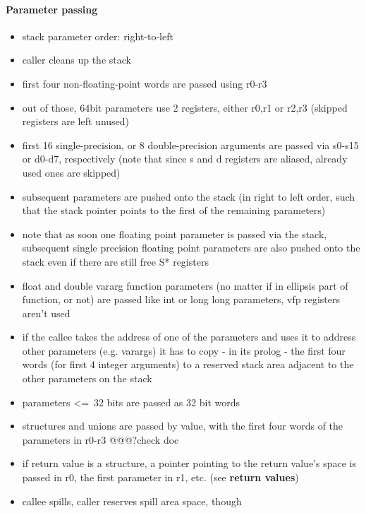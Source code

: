 \paragraph{Parameter passing}

\begin{itemize}
\item stack parameter order: right-to-left
\item caller cleans up the stack
\item first four non-floating-point words are passed using r0-r3
\item out of those, 64bit parameters use 2 registers, either r0,r1 or r2,r3 (skipped registers are left unused)
\item first 16 single-precision, or 8 double-precision arguments are passed via s0-s15 or d0-d7, respectively (note that since s and d registers are aliased, already used ones are skipped)
\item subsequent parameters are pushed onto the stack (in right to left order, such that the stack pointer points to the first of the remaining parameters)
\item note that as soon one floating point parameter is passed via the stack, subsequent single precision floating point parameters are also pushed onto the stack even if there are still free S* registers
\item float and double vararg function parameters (no matter if in ellipsis part of function, or not) are passed like int or long long parameters, vfp registers aren't used
\item if the callee takes the address of one of the parameters and uses it to address other parameters (e.g. varargs) it has to copy - in its prolog - the first four words (for first 4 integer arguments) to a reserved stack area adjacent to the other parameters on the stack
\item parameters \textless=\ 32 bits are passed as 32 bit words
\item structures and unions are passed by value, with the first four words of the parameters in r0-r3 @@@?check doc
\item if return value is a structure, a pointer pointing to the return value's space is passed in r0, the first parameter in r1, etc. (see {\bf return values})
\item callee spills, caller reserves spill area space, though
\end{itemize}

